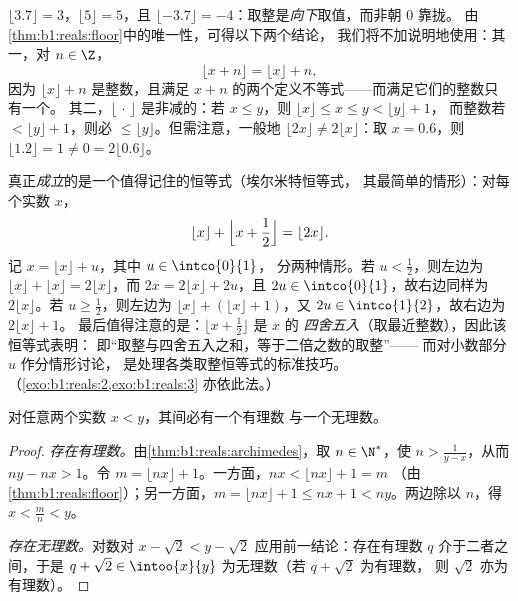 \begin{example}[取整函数的应用]\label{ex:b1:reals:floorpractice}
$\lfloor 3.7 \rfloor = 3$，$\lfloor 5 \rfloor = 5$，且 $\lfloor
-3.7 \rfloor = -4$：取整是\emph{向下}取值，而非朝 $0$ 靠拢。
由\cref{thm:b1:reals:floor}中的唯一性，可得以下两个结论，
我们将不加说明地使用：其一，对 $n \in \Z$，
\[
\lfloor x + n \rfloor = \lfloor x \rfloor + n ,
\]
因为 $\lfloor x \rfloor + n$ 是整数，且满足
$x + n$ 的两个定义不等式——而满足它们的整数只有一个。
其二，$\lfloor \, \cdot \, \rfloor$ 是非减的：若 $x \leq
y$，则 $\lfloor x \rfloor \leq x \leq y < \lfloor y \rfloor + 1$，
而整数若 $< \lfloor y \rfloor + 1$，则必 $\leq \lfloor y
\rfloor$。但需注意，一般地 $\lfloor 2x \rfloor \neq 2\lfloor
x \rfloor$：取 $x = 0.6$，则 $\lfloor 1.2 \rfloor = 1
\neq 0 = 2\lfloor 0.6 \rfloor$。

真正\emph{成立}的是一个值得记住的恒等式（埃尔米特恒等式，
其最简单的情形）：对每个实数 $x$，
\[
\lfloor x \rfloor + \Bigl\lfloor x + \frac12 \Bigr\rfloor
= \lfloor 2x \rfloor .
\]
记 $x = \lfloor x\rfloor + u$，其中 $u \in \intco{0}{1}$，
分两种情形。若 $u < \frac12$，则左边为 $\lfloor
x\rfloor + \lfloor x\rfloor = 2\lfloor x\rfloor$，而 $2x =
2\lfloor x\rfloor + 2u$，且 $2u \in \intco{0}{1}$，故右边同样为
$2\lfloor x\rfloor$。若 $u \geq \frac12$，则左边为
$\lfloor x\rfloor + (\lfloor x\rfloor + 1)$，又 $2u \in
\intco{1}{2}$，故右边为 $2\lfloor x\rfloor + 1$。
最后值得注意的是：$\lfloor x + \frac12\rfloor$ 是 $x$ 的
\emph{四舍五入}（取最近整数），因此该恒等式表明：
即“取整与四舍五入之和，等于二倍之数的取整”——
而对小数部分 $u$ 作分情形讨论，
是处理各类取整恒等式的标准技巧。
（\cref{exo:b1:reals:2,exo:b1:reals:3} 亦依此法。）
\end{example}

\begin{theorem}\label{thm:b1:reals:density}
对任意两个实数 $x < y$，其间必有一个有理数
与一个无理数。
\end{theorem}

\begin{proof}
\emph{存在有理数。}由\cref{thm:b1:reals:archimedes}，取 $n \in
\N^*$，使 $n > \frac{1}{y - x}$，从而 $ny - nx > 1$。令 $m = \lfloor
nx \rfloor + 1$。一方面，$nx < \lfloor nx \rfloor + 1 = m$
（由\cref{thm:b1:reals:floor}）；另一方面，$m = \lfloor nx \rfloor +
1 \leq nx + 1 < ny$。两边除以 $n$，得 $x < \frac mn < y$。

\emph{存在无理数。}对数对 $x -
\sqrt 2 < y - \sqrt 2$ 应用前一结论：存在有理数 $q$ 介于二者之间，于是
$q + \sqrt 2 \in \intoo{x}{y}$ 为无理数（若 $q + \sqrt 2$ 为有理数，
则 $\sqrt 2$ 亦为有理数）。
\end{proof}

